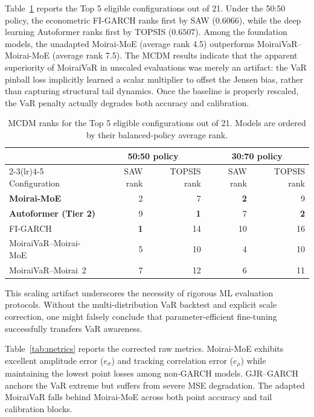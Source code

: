 \documentclass[runningheads]{llncs}
\begin{document}
Table~\ref{tab:fullrank} reports the Top 5 eligible configurations out of 21. Under the 50:50 policy, the econometric FI-GARCH ranks first by SAW (\(0.6066\)), while the deep learning Autoformer ranks first by TOPSIS (\(0.6507\)). Among the foundation models, the unadapted Moirai-MoE (average rank 4.5) outperforms MoiraiVaR--Moirai-MoE (average rank 7.5). The MCDM results indicate that the apparent superiority of MoiraiVaR in unscaled evaluations was merely an artifact: the VaR pinball loss implicitly learned a scalar multiplier to offset the Jensen bias, rather than capturing structural tail dynamics. Once the baseline is properly rescaled, the VaR penalty actually degrades both accuracy and calibration.

\begin{table}[t]
\centering
\caption{MCDM ranks for the Top 5 eligible configurations out of 21. Models are ordered by their balanced-policy average rank.}
\label{tab:fullrank}
\small
\setlength{\tabcolsep}{5pt}
\begin{tabular}{lrrrr}
\toprule
& \multicolumn{2}{c}{50:50 policy} & \multicolumn{2}{c}{30:70 policy} \\
\cmidrule(lr){2-3}\cmidrule(lr){4-5}
Configuration & SAW rank & TOPSIS rank & SAW rank & TOPSIS rank \\
\midrule
\textbf{Moirai-MoE} & 2 & 7 & \textbf{2} & 9 \\
\textbf{Autoformer (Tier 2)} & 9 & \textbf{1} & 7 & \textbf{2} \\
FI-GARCH & \textbf{1} & 14 & 10 & 16 \\
MoiraiVaR--Moirai-MoE & 5 & 10 & 4 & 10 \\
MoiraiVaR--Moirai~2 & 7 & 12 & 6 & 11 \\
\bottomrule
\end{tabular}
\end{table}

This scaling artifact underscores the necessity of rigorous ML evaluation protocols. Without the multi-distribution VaR backtest and explicit scale correction, one might falsely conclude that parameter-efficient fine-tuning successfully transfers VaR awareness.

Table~\ref{tab:metrics} reports the corrected raw metrics. Moirai-MoE exhibits excellent amplitude error (\(e_\sigma\)) and tracking correlation error (\(e_\rho\)) while maintaining the lowest point losses among non-GARCH models. GJR--GARCH anchors the VaR extreme but suffers from severe MSE degradation. The adapted MoiraiVaR falls behind Moirai-MoE across both point accuracy and tail calibration blocks.
\end{document}
